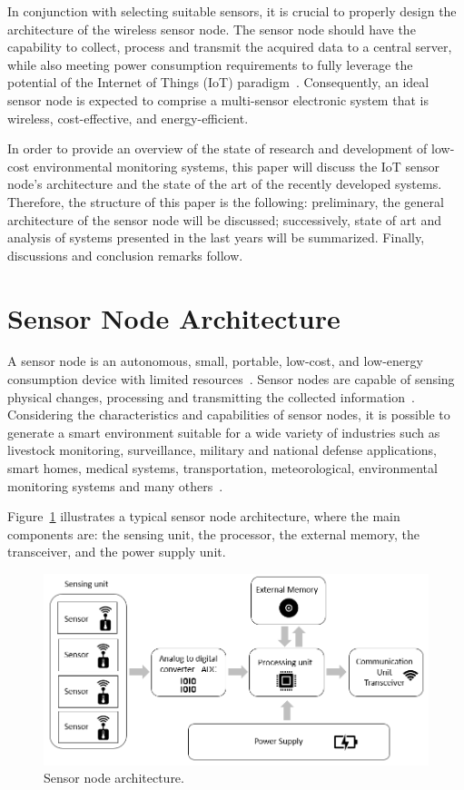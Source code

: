 \documentclass[10pt]{../imeko_acta}
\begin{document}
In conjunction with selecting suitable sensors, it is crucial to properly design the architecture of the wireless sensor node. The sensor node should have the capability to collect, process and transmit the acquired data to a central server, while also meeting power consumption requirements to fully leverage the potential of the Internet of Things (IoT) paradigm~\cite{suryavansh2021data, 5522465}. Consequently, an ideal sensor node is expected to comprise a multi-sensor electronic system that is wireless, cost-effective, and energy-efficient.

In order to provide an overview of the state of research and development of low-cost environmental monitoring systems, this paper will discuss the IoT sensor node's architecture and the state of the art of the recently developed systems. Therefore, the structure of this paper is the following: preliminary, the general architecture of the sensor node will be discussed; successively, state of art and analysis of systems presented in the last years will be summarized. Finally, discussions and conclusion remarks follow.

\section{Sensor Node Architecture}
A sensor node is an autonomous, small, portable, low-cost, and low-energy consumption device with limited resources~\cite{TENG2012251, STANKOVIC2013223}. Sensor nodes are capable of sensing physical changes, processing and transmitting the collected information~\cite{1197877, 9764728}. Considering the characteristics and capabilities of sensor nodes, it is possible to generate a smart environment suitable for a wide variety of industries such as livestock monitoring, surveillance,  military and national defense applications, smart homes, medical systems, transportation, meteorological, environmental monitoring systems and many others~\cite{1197877, 6859717, farha2010middleware, 5639549}.

Figure~\ref{sensor_node} illustrates a typical sensor node architecture, where the main components are: the sensing unit, the processor, the external memory, the transceiver, and the power supply unit. 

\begin{figure}[!tb]
	\centering
	\includegraphics[width=\linewidth]{sensor_node_architectutre.png}
	\caption{Sensor node architecture.}
	\label{sensor_node}
\end{figure}
\end{document}
